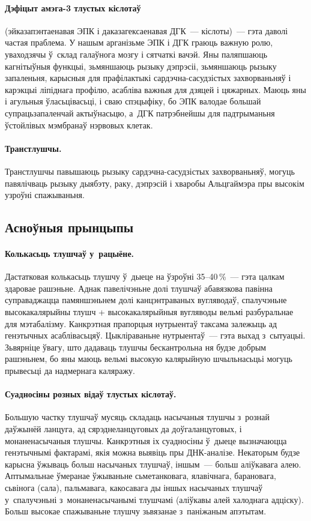 \paragraph{Дэфіцыт амэга-3 тлустых кіслотаў} (эйказапэнтаенавая ЭПК і даказагексаенавая ДГК~--- кіслоты)~--- гэта даволі частая праблема.
У нашым арганізьме ЭПК і ДГК граюць важную ролю, уваходзячы ў~склад галаўнога мозгу і сятчаткі вачэй. Яны паляпшаюць кагнітыўныя функцыі, зьмяншаюць рызыку дэпрэсіі, зьмяншаюць рызыку запаленьня, карысныя для прафілактыкі сардэчна-сасудзістых захворваньняў і карэкцыі ліпіднага профілю, асабліва важныя для дзяцей і цяжарных. Маюць яны і агульныя ўласьцівасьці, і сваю спэцыфіку, бо ЭПК валодае большай супрацьзапаленчай актыўнасьцю, а~ДГК патрэбнейшы для падтрыманьня ўстойлівых мэмбранаў нэрвовых клетак.

\paragraph{Транстлушчы.}
Транстлушчы павышаюць рызыку сар\-дэч\-на-сасудзістых захворваньняў, могуць павялічваць рызыку дыябэту, раку, дэпрэсій і хваробы Альцгаймэра пры высокім узроўні спажываньня.

\subsection{Асноўныя прынцыпы}

\paragraph{Колькасьць тлушчаў у~рацыёне.}
Дастатковая колькасьць тлушчу ў~дыеце на ўзроўні 35--40\,\%~--- гэта цалкам здаровае рашэньне. Аднак павелічэньне долі тлушчаў абавязкова павінна суправаджацца памяншэньнем долі канцэнтраваных вугляводаў, спалучэньне высокакалярыйны тлушч + высокакалярыйныя вугляводы вельмі разбуральнае для мэтабалізму. Канкрэтная прапорцыя нутрыентаў таксама залежыць ад генэтычных асаблівасьцяў. Цыкліраваньне нутрыентаў~--- гэта выхад з~сытуацыі. Зьвярніце ўвагу, што дадаваць тлушчы бескантрольна ня будзе добрым рашэньнем, бо яны маюць вельмі высокую калярыйную шчыльнасьцьі могуць прывесьці да надмернага каляражу.

\paragraph{Суадносіны розных відаў тлустых кіслотаў.}
Большую частку тлушчаў мусяць складаць насычаныя тлушчы з~рознай даўжынёй ланцуга, ад сярэднеланцуговых да доўгаланцуговых, і монаненасычаныя тлушчы. Канкрэтныя іх суадносіны ў~дыеце вызначаюцца генэтычнымі фактарамі, якія можна выявіць пры ДНК-аналізе. Некаторым будзе карысна ўжываць больш насычаных тлушчаў, іншым~--- больш аліўкавага алею. Аптымальнае ўмеранае ўжываньне сьметанковага, ялавічнага, барановага, сьвінога (сала), пальмавага, какосавага ды іншых насычаных тлушчаў у~спалучэньні з~монаненасычанымі тлушчамі (аліўкавы алей халоднага адціску). Больш высокае спажываньне тлушчу зьвязанае з~паніжаным апэтытам.

